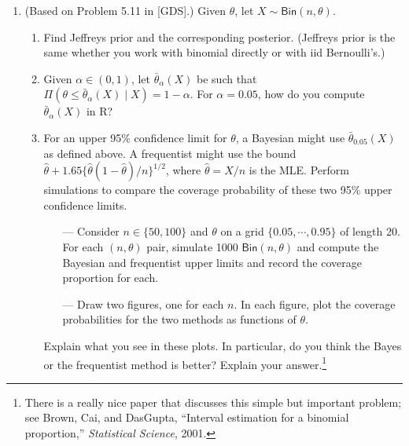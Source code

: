 \documentclass[a4paper,12pt]{article}
\newcommand{\bin}{\mathsf{Bin}}
\begin{document}
\begin{enumerate}
\item (Based on Problem 5.11 in [GDS].)  Given $\theta$, let $X \sim \bin(n,\theta)$. 
\begin{enumerate}
\item Find Jeffreys prior and the corresponding posterior.  (Jeffreys prior is the same whether you work with binomial directly or with iid Bernoulli's.)
\item Given $\alpha \in (0,1)$, let $\bar\theta_\alpha(X)$ be such that $\Pi(\theta \leq \bar\theta_\alpha(X) \mid X) = 1-\alpha$.  For $\alpha=0.05$, how do you compute $\bar\theta_\alpha(X)$ in R?  
\item For an upper 95\% confidence limit for $\theta$, a Bayesian might use $\bar\theta_{0.05}(X)$ as defined above.  A frequentist might use the bound $\hat\theta + 1.65 \{\hat\theta(1-\hat\theta)/n\}^{1/2}$, where $\hat\theta=X/n$ is the MLE.  Perform simulations to compare the coverage probability of these two 95\% upper confidence limits.  
\begin{itemize}
\item[---] Consider $n \in \{50,100\}$ and $\theta$ on a grid $\{0.05, \cdots, 0.95\}$ of length 20.  For each $(n,\theta)$ pair, simulate 1000 $\bin(n,\theta)$ and compute the Bayesian and frequentist upper limits and record the coverage proportion for each.  
\item[---] Draw two figures, one for each $n$.  In each figure, plot the coverage probabilities for the two methods as functions of $\theta$.  
\end{itemize}  
Explain what you see in these plots.  In particular, do you think the Bayes or the frequentist method is better?  Explain your answer.\footnote{There is a really nice paper that discusses this simple but important problem; see Brown, Cai, and DasGupta, ``Interval estimation for a binomial proportion,'' \emph{Statistical Science}, 2001.}
\end{enumerate}

\end{enumerate}
\end{document}
